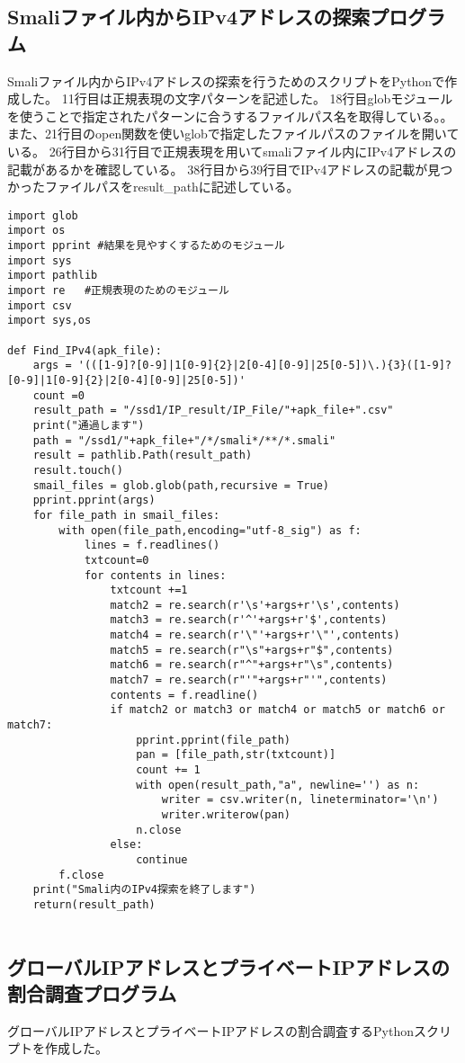 \documentclass[a4j]{jarticle}
\begin{document}
\subsection{Smaliファイル内からIPv4アドレスの探索プログラム}
Smaliファイル内からIPv4アドレスの探索を行うためのスクリプトをPythonで作成した。
11行目は正規表現の文字パターンを記述した。
18行目globモジュールを使うことで指定されたパターンに合うするファイルパス名を取得している。。
また、21行目のopen関数を使いglobで指定したファイルパスのファイルを開いている。
26行目から31行目で正規表現を用いてsmaliファイル内にIPv4アドレスの記載があるかを確認している。
38行目から39行目でIPv4アドレスの記載が見つかったファイルパスをresult\_pathに記述している。
\begin{lstlisting}[caption=Smaliファイル内からIPv4アドレスの探索を行うためのPythonスクリプト]
import glob
import os
import pprint #結果を見やすくするためのモジュール
import sys
import pathlib
import re   #正規表現のためのモジュール
import csv
import sys,os

def Find_IPv4(apk_file):
	args = '(([1-9]?[0-9]|1[0-9]{2}|2[0-4][0-9]|25[0-5])\.){3}([1-9]?[0-9]|1[0-9]{2}|2[0-4][0-9]|25[0-5])'
	count =0
	result_path = "/ssd1/IP_result/IP_File/"+apk_file+".csv"
	print("通過します")
	path = "/ssd1/"+apk_file+"/*/smali*/**/*.smali"
	result = pathlib.Path(result_path)
	result.touch()
	smail_files = glob.glob(path,recursive = True)
	pprint.pprint(args)
	for file_path in smail_files:
		with open(file_path,encoding="utf-8_sig") as f:
			lines = f.readlines()
			txtcount=0
			for contents in lines:
				txtcount +=1
				match2 = re.search(r'\s'+args+r'\s',contents)
				match3 = re.search(r'^'+args+r'$',contents)
				match4 = re.search(r'\"'+args+r'\"',contents)
				match5 = re.search(r"\s"+args+r"$",contents)
				match6 = re.search(r"^"+args+r"\s",contents)
				match7 = re.search(r"'"+args+r"'",contents)
				contents = f.readline()
				if match2 or match3 or match4 or match5 or match6 or match7:
					pprint.pprint(file_path)
					pan = [file_path,str(txtcount)]
					count += 1
					with open(result_path,"a", newline='') as n:
						writer = csv.writer(n, lineterminator='\n')
						writer.writerow(pan)
					n.close
				else:
					continue
		f.close
	print("Smali内のIPv4探索を終了します")
	return(result_path)
		
\end{lstlisting}

\subsection{グローバルIPアドレスとプライベートIPアドレスの割合調査プログラム}
グローバルIPアドレスとプライベートIPアドレスの割合調査するPythonスクリプトを作成した。
\end{document}
